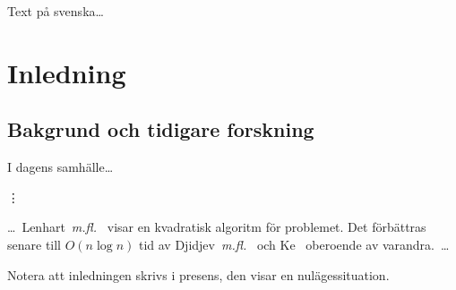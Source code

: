 \documentclass[swedish]{maucsthesis}
\begin{document}

\author{Anna Andersson \and Bo Boelsson \and varje författare på egen rad i bokstavsordning efter efternamn}

\subject{datavetenskap} %


\maketitle %

\begin{sammanfattning}
Text på svenska\ldots
\end{sammanfattning}

\begin{abstract}
Text in English\ldots
\end{abstract}

\ifodd\value{page}\else\mbox{}\newpage\fi
\tableofcontents
\newpage
\startpagecount

\section{Inledning}

\subsection{Bakgrund och tidigare forskning}

I dagens samhälle\ldots

\vdots

\ldots\ Lenhart~{\em m.fl.}~\cite{Lenhart1988} visar en
kvadratisk algoritm för problemet. Det förbättras senare till $O(n\log n)$ tid av
Djidjev~{\em m.fl.}~\cite{Djidjev1992} och Ke~\cite{Ke1989} oberoende av varandra.~\ldots

Notera att inledningen skrivs i presens, den visar en nulägessituation.
\end{document}
